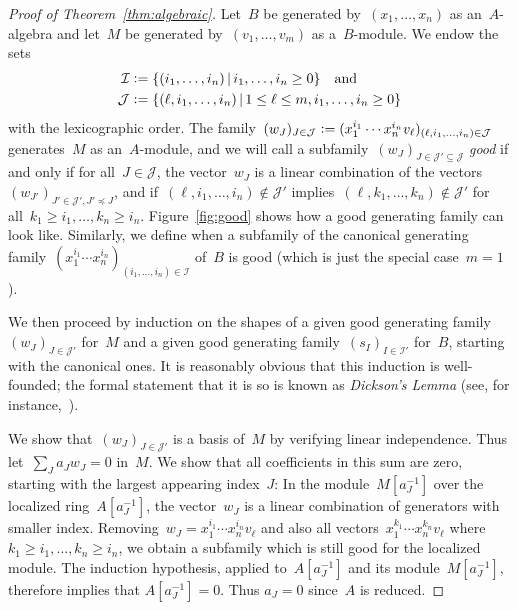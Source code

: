 \documentclass[oneside]{amsart}
\theoremstyle{definition}
\theoremstyle{plain}
\theoremstyle{remark}
\newcommand{\I}{\mathcal{I}}
\newcommand{\J}{\mathcal{J}}
\newcommand{\defeq}{\vcentcolon=}
\begin{document}
\begin{proof}[Proof of Theorem~\ref{thm:algebraic}]
Let~$B$ be generated by~$(x_1,\ldots,x_n)$ as an~$A$-algebra and
let~$M$ be generated by~$(v_1,\ldots,v_m)$ as a~$B$-module. We endow the sets
\begin{align*}
  \I &\defeq \{ (i_1,\ldots,i_n) \,|\, i_1,\ldots,i_n \geq 0 \}
  \quad\text{and} \\
  \J &\defeq \{ (\ell, i_1,\ldots,i_n) \,|\, 1 \leq \ell \leq m, i_1,\ldots,i_n \geq 0 \}
\end{align*}
with the lexicographic order. The family~$(w_J)_{J \in \J} \defeq (x_1^{i_1}
\cdots x_n^{i_n} v_\ell)_{(\ell,i_1,\ldots,i_n) \in \J}$ generates~$M$ as
an~$A$-module, and we will call a subfamily~$(w_J)_{J \in \J' \subseteq \J}$
\emph{good} if and only if for all~$J \in \J$, the vector~$w_J$ is a linear
combination of the vectors~$(w_{J'})_{J' \in \J', J' \preceq J}$,
and if~$(\ell,i_1,\ldots,i_n) \not\in \J'$ implies~$(\ell,k_1,\ldots,k_n) \not\in
\J'$ for all~$k_1 \geq i_1, \ldots, k_n \geq i_n$. Figure~\ref{fig:good} shows
how a good generating family can look like.
Similarly, we define when a subfamily of the canonical generating
family~$(x_1^{i_1} \cdots x_n^{i_n})_{(i_1,\ldots,i_n) \in \I}$ of~$B$ is good
(which is just the special case~$m = 1$).

We then proceed by induction on the
shapes of a given good generating family~$(w_J)_{J \in \J'}$ for~$M$ and a given
good generating family~$(s_I)_{I \in \I'}$ for~$B$, starting with the canonical ones. It is
reasonably obvious that this induction is well-founded; the formal statement
that it is so is known as \emph{Dickson's Lemma} (see, for
instance,~\cite[Thm.~1.1]{veldman:kruskal}).

We show that~$(w_J)_{J \in \J'}$ is a basis of~$M$ by verifying linear
independence. Thus let~$\sum_J a_J w_J = 0$ in~$M$. We show that all
coefficients in this sum are zero, starting with the largest
appearing index~$J$: In the module~$M[a_J^{-1}]$ over the localized ring~$A[a_J^{-1}]$,
the vector~$w_J$ is a linear combination of generators with
smaller index. Removing~$w_J = x_1^{i_1} \cdots x_n^{i_n} v_\ell$ and also all
vectors~$x_1^{k_1} \cdots x_n^{k_n} v_\ell$ where~$k_1 \geq i_1, \ldots,
k_n \geq i_n$, we obtain a subfamily which is still good for
the localized module. The induction hypothesis, applied
to~$A[a_J^{-1}]$ and its module~$M[a_J^{-1}]$, therefore implies that $A[a_J^{-1}] = 0$.
Thus $a_J = 0$ since~$A$ is reduced.


\end{proof}
\end{document}
